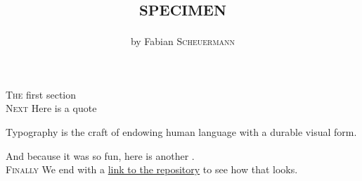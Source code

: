 \documentclass[a4paper,11pt,oneside,DIV=12,twocolumn]{scrartcl}
\title{\rmfamily\normalfont\scshape specimen}
\author{by Fabian \textsc{Scheuermann}}
\date{}
\begin{document}
\maketitle

\lettrine[lines=2,nindent=0.em]{T}{he} first section \blindtext \\

\lettrine[lines=2,nindent=0.em]{N}{ext} \blindtext 
Here is a quote
\begin{displayquote}
Typography is the craft of endowing human language with a durable visual form.
\end{displayquote}

\blindtext
And because it was so fun, here is another . \\

\lettrine[lines=2,nindent=0.em]{F}{inally} \blindtext \blindtext We end with a \href{https://github.com/fschmnn/article-template}{link to the repository} to see how that looks.
\end{document}
